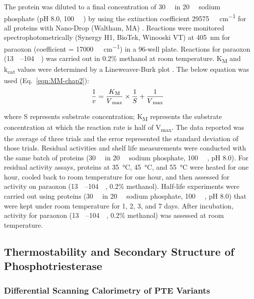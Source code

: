 \begin{refsection}
The protein was diluted to a final concentration of \SI{30}{\nano\Molar} in
\SI{20}{\milli\Molar} sodium phosphate (pH 8.0, \SI{100}{\micro\Molar}
) by using the extinction coefficient \SI{29575}{\per\Molar\per\cm}
for all proteins with Nano-Drop (Waltham, MA) \cite{Gasteiger2005, Pace1995}.
Reactions were monitored spectrophotometrically (Synergy H1, BioTek, Winooski
VT) at \SI{405}{\nm} for paraoxon (coefficient = \SI{17000}{\per\Molar\per\cm})
\cite{Baker2011b} in a 96-well plate. Reactions for paraoxon
(\SIrange{13}{104}{\micro\Molar}) was carried out in 0.2\% methanol at room
temperature.  K\textsubscript{M} and k\textsubscript{cat} values were
determined by a Lineweaver-Burk plot \cite{Baker2011b}. The below equation was
used (Eq.~\ref{eqn:MM-chap2}):
\begin{equation} \frac{1}{v} =
    \frac{K\textsubscript{M}}{V\textsubscript{max}}\times\frac{1}{S} +
    \frac{1}{V\textsubscript{max}} \label{eqn:MM-chap2} \end{equation}

where S represents substrate concentration; K\textsubscript{M} represents the
substrate concentration at which the reaction rate is half of
V\textsubscript{max}. The data reported was the average of three trials and the
error represented the standard deviation of those trials. Residual activities
and shelf life measurements were conducted with the same batch of proteins
(\SI{30}{\nano\Molar} in \SI{20}{\milli\Molar} sodium phosphate,
\SI{100}{\micro\Molar} , pH 8.0). For residual activity assays,
proteins at \SI{35}{\celsius}, \SI{45}{\celsius}, and \SI{55}{\celsius} were
heated for one hour, cooled back to room temperature for one hour, and then
assessed for activity on paraoxon (\SIrange{13}{104}{\micro\Molar}, 0.2\%
methanol).  Half-life experiments were carried out using proteins
(\SI{30}{\nano\Molar} in \SI{20}{\milli\Molar} sodium phosphate,
\SI{100}{\micro\Molar} , pH 8.0) that were kept under room
temperature for 1, 2, 3, and 7 days. After incubation, activity for paraoxon
(\SIrange{13}{104}{\micro\Molar}, 0.2\% methanol) was assessed at room
temperature. 

\subsection{Thermostability and Secondary Structure of Phosphotriesterase}

\subsubsection{Differential Scanning Calorimetry of PTE Variants}


\end{refsection}
